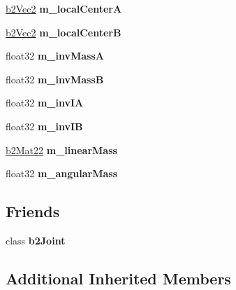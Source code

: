 \begin{DoxyCompactItemize}
\item 
\mbox{\label{classb2FrictionJoint_af732965abe1f29f7469e1ea17506218c}} 
\hyperlink{structb2Vec2}{b2\+Vec2} {\bfseries m\+\_\+local\+CenterA}
\item 
\mbox{\label{classb2FrictionJoint_a55739866c1f3423caf2116e0a869ec45}} 
\hyperlink{structb2Vec2}{b2\+Vec2} {\bfseries m\+\_\+local\+CenterB}
\item 
\mbox{\label{classb2FrictionJoint_a7b7a482216efd081db94465db409fa21}} 
float32 {\bfseries m\+\_\+inv\+MassA}
\item 
\mbox{\label{classb2FrictionJoint_a189a3869e59f6b1e00c83fcaf6b08253}} 
float32 {\bfseries m\+\_\+inv\+MassB}
\item 
\mbox{\label{classb2FrictionJoint_aad004207b7392e9828f55d8f15dc2aa8}} 
float32 {\bfseries m\+\_\+inv\+IA}
\item 
\mbox{\label{classb2FrictionJoint_a79ab8b49c2d4ce6415e3fe9376947d4c}} 
float32 {\bfseries m\+\_\+inv\+IB}
\item 
\mbox{\label{classb2FrictionJoint_aa49bf4b20865a4976c3fae8398191182}} 
\hyperlink{structb2Mat22}{b2\+Mat22} {\bfseries m\+\_\+linear\+Mass}
\item 
\mbox{\label{classb2FrictionJoint_ab8f9aa5e516d90f1c80f92b0eb410c38}} 
float32 {\bfseries m\+\_\+angular\+Mass}
\end{DoxyCompactItemize}
\subsection*{Friends}
\begin{DoxyCompactItemize}
\item 
\mbox{\label{classb2FrictionJoint_a2f8aeb7f12b8fbe115431953a4926eed}} 
class {\bfseries b2\+Joint}
\end{DoxyCompactItemize}
\subsection*{Additional Inherited Members}


